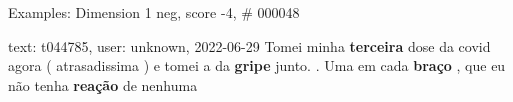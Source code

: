 \begin{frame}{Examples: Dimension 1 neg, score -4, \# 000048}
\footnotesize
\begin{alertblock}{text: t044785, user: unknown, 2022-06-29}
Tomei minha \textbf{terceira} dose da covid agora ( atrasadissima ) e tomei a 
da \textbf{gripe} junto. . Uma em cada \textbf{braço} , que eu não tenha 
\textbf{reação} de nenhuma 
\end{alertblock}
\end{frame}
